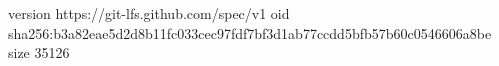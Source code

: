 version https://git-lfs.github.com/spec/v1
oid sha256:b3a82eae5d2d8b11fc033cec97fdf7bf3d1ab77ccdd5bfb57b60c0546606a8be
size 35126
